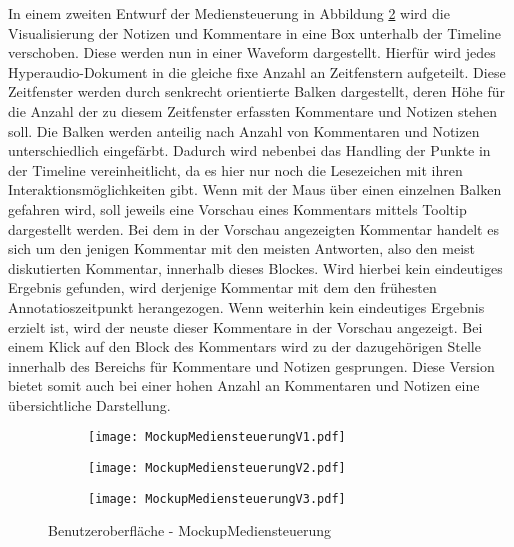 In einem zweiten Entwurf der Mediensteuerung in Abbildung \ref{fig:MockupMediensteuerungV2} wird die Visualisierung der Notizen und Kommentare in eine Box unterhalb der Timeline verschoben. Diese werden nun in einer Waveform dargestellt. Hierfür wird jedes Hyperaudio-Dokument in die gleiche fixe Anzahl an Zeitfenstern aufgeteilt. Diese Zeitfenster werden durch senkrecht orientierte Balken dargestellt, deren Höhe für die Anzahl der zu diesem Zeitfenster erfassten Kommentare und Notizen stehen soll. Die Balken werden anteilig nach Anzahl von Kommentaren und Notizen unterschiedlich eingefärbt. Dadurch wird nebenbei das Handling der Punkte in der Timeline vereinheitlicht, da es hier nur noch die Lesezeichen mit ihren Interaktionsmöglichkeiten gibt. Wenn mit der Maus über einen einzelnen Balken gefahren wird, soll jeweils eine Vorschau eines Kommentars mittels Tooltip dargestellt werden. Bei dem in der Vorschau angezeigten Kommentar handelt es sich um den jenigen Kommentar mit den meisten Antworten, also den meist diskutierten Kommentar, innerhalb dieses Blockes. Wird hierbei kein eindeutiges Ergebnis gefunden, wird derjenige Kommentar mit dem den frühesten Annotatioszeitpunkt herangezogen. Wenn weiterhin kein eindeutiges Ergebnis erzielt ist, wird der neuste dieser Kommentare in der Vorschau angezeigt. Bei einem Klick auf den Block des Kommentars wird zu der dazugehörigen Stelle innerhalb des Bereichs für Kommentare und Notizen gesprungen. Diese Version bietet somit auch bei einer hohen Anzahl an Kommentaren und Notizen eine übersichtliche Darstellung.

\begin{figure}[h!]
\begin{subfigure}[c]{\textwidth}
\texttt{[image: MockupMediensteuerungV1.pdf]}
\label{fig:MockupMediensteuerungV1}
\end{subfigure}
\par\bigskip
\begin{subfigure}[c]{\textwidth}
\texttt{[image: MockupMediensteuerungV2.pdf]}
\label{fig:MockupMediensteuerungV2}
\end{subfigure}
\par\bigskip
\begin{subfigure}[c]{\textwidth}
\texttt{[image: MockupMediensteuerungV3.pdf]}
\label{fig:MockupMediensteuerungV3}
\end{subfigure}
\caption{Benutzeroberfläche - MockupMediensteuerung}
\label{fig:MockupMediensteuerung}
\end{figure}

